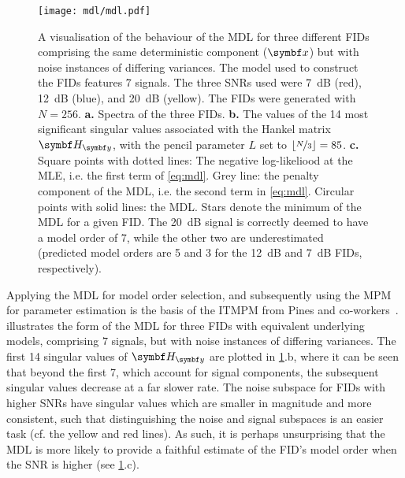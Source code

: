 \begin{figure}%
    \centering
    \texttt{[image: mdl/mdl.pdf]}
    \caption[%
        A visualisation of the behaviour of the \acs{MDL} for three different
        \acsp{FID} comprising the same deterministic component, but with
        different noise variances.
    ]{%
        A visualisation of the behaviour of the \acs{MDL} for three different
        \acsp{FID} comprising the same deterministic component ($\bx$) but
        with noise instances of differing variances. The model used
        to construct the \acp{FID} features 7
        signals. The three \acsp{SNR} used were
        \qty{7}{\deci\bel} (red), \qty{12}{\deci\bel} (blue), and
        \qty{20}{\deci\bel} (yellow). The \acsp{FID} were generated with $N
        = 256$.
        \textbf{a.} Spectra of the three \acsp{FID}.
        \textbf{b.} The values of the 14 most significant singular values
        associated with the Hankel matrix $\Hy$, with the
        pencil parameter $L$ set to $\lfloor \nicefrac{N}{3} \rfloor =
        85$.
        \textbf{c.} Square points with dotted lines: The negative log-likeliood
        at the \ac{MLE}, i.e. the first term of \cref{eq:mdl}.
        Grey line: the penalty component of the \ac{MDL}, i.e. the second
        term in \cref{eq:mdl}.
        Circular points with solid lines: the \ac{MDL}.
        Stars denote the minimum of the \ac{MDL} for a given \ac{FID}. The
        \qty{20}{\deci\bel}
        signal is correctly deemed to have a model order of 7, while the other
        two are underestimated (predicted model orders are 5 and 3 for the
        \qty{12}{\deci\bel} and \qty{7}{\deci\bel} \acsp{FID}, respectively).
    }%
    \label{fig:mdl}%
\end{figure}%
Applying the \ac{MDL} for model order selection, and subsequently using the
\ac{MPM} for parameter estimation is the basis of the \ac{ITMPM} from Pines and
co-workers~\cite{Lin1997}.
 illustrates the form of the \ac{MDL} for three \acp{FID}
with equivalent underlying models, comprising $7$ signals, but with noise
instances of differing variances. The first 14 singular values of $\Hy$
are plotted in \cref{fig:mdl}.b, where it can be seen that beyond the first 7,
which account for signal components, the subsequent singular values decrease
at a far slower rate. The noise subspace for \acp{FID} with higher \acp{SNR}
have singular values which are smaller in magnitude and more
consistent, such that distinguishing the noise and signal subspaces is an
easier task (cf. the yellow and red lines). As such, it is perhaps
unsurprising that the \ac{MDL} is more likely to provide a faithful estimate of
the \ac{FID}'s model order when the \ac{SNR} is higher (see \cref{fig:mdl}.c).
